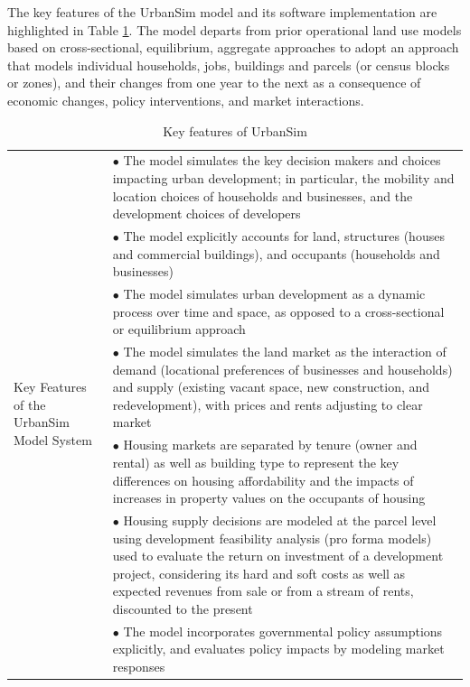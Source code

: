 The key features of the UrbanSim model and its software implementation are highlighted in Table \ref{tab:key-features}. The model departs from prior operational land use models based on cross-sectional, equilibrium, aggregate approaches to adopt an approach that models individual households, jobs, buildings and parcels (or census blocks or zones), and their changes from one year to the next as a consequence of economic changes, policy interventions, and market interactions.

\begin{table}[htbp]
\caption{Key features of UrbanSim}
\label{tab:key-features}
\begin{center}
\begin{tabular}{ p{1.5in} p{4.4in} }
\toprule[1.5pt]
\multirow[c]{10}{1.5in}{Key Features of the UrbanSim
Model System} & $\bullet$ The model simulates the key decision makers and
choices impacting urban development; in particular, the mobility and
location choices of households and businesses, and the development
choices of developers\\
& $\bullet$ The model explicitly accounts for land, structures (houses and commercial buildings), and occupants (households and businesses)\\
& $\bullet$ The model simulates urban development as a dynamic process over time and space, as opposed to a cross-sectional or equilibrium approach\\
& $\bullet$ The model simulates the land market as the interaction of demand (locational preferences of businesses and households) and supply (existing vacant space, new construction, and redevelopment), with prices and rents adjusting to clear market\\
& $\bullet$ Housing markets are separated by tenure (owner and rental) as well as building type to represent the key differences on housing affordability and the impacts of increases in property values on the occupants of housing\\
& $\bullet$ Housing supply decisions are modeled at the parcel level using development feasibility analysis (pro forma models) used to evaluate the return on investment of a development project, considering its hard and soft costs as well as expected revenues from sale or from a stream of rents, discounted to the present\\
& $\bullet$ The model incorporates governmental policy assumptions explicitly, and evaluates policy impacts by modeling market responses\\

\end{tabular}
\end{center}
\end{table}
